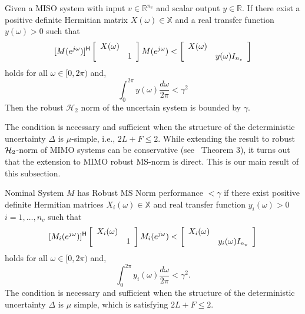 \begin{lemma}\label{MISOH_2}\cite{Sznaier1999RobustH2}
Given a MISO system with input $v\in \mathbb{R}^{n_v}$ and scalar output \(y\in\mathbb{R}\). If there exist a positive definite Hermitian matrix $X(\omega)\in \mathbb{X}$ and a real transfer function $y(\omega)>0$ such that
\begin{equation}\label{freqbound}
    [M(e^{j\omega})]^{\mathsf{H}} \left[
\begin{array}{cc}
    X(\omega) &  \\
     & 1
\end{array}\right]M(e^{j\omega})<\left[
\begin{array}{cc}
    X(\omega) &  \\
     & y(\omega)I_{n_v}
\end{array}\right]
\end{equation} holds for all $\omega\in[0,2\pi)$ and,
\begin{equation}\label{intbyfreq}
    \int_0^{2\pi}y(\omega)\frac{d\omega}{2\pi}<\gamma^2    
\end{equation}
Then the robust $\mathcal{H}_2$ norm of the uncertain system is bounded by $\gamma$.

\end{lemma}
The condition is necessary and sufficient when the structure of the deterministic uncertainty $\Delta$ is $\mu$-simple, i.e., $2L+F\leq2$. While extending the result to robust ${\cal H}_2$-norm of MIMO systems can be conservative (see~\cite{Sznaier2000WNrobustH2} Theorem 3), it turns out that the extension to MIMO robust MS-norm is direct. This is our main result of this subsection. 
\begin{thm}\label{thm:robMSnorm}
Nominal System $M$ has Robust MS Norm performance $<\gamma$ if there exist 
positive definite Hermitian matrices $X_i(\omega)\in \mathbb{X}$ and real transfer function $y_i(\omega)>0$
$i=1,\hdots,n_v$ such that 
\begin{equation}\label{eqn:freqbound_2}
    [M_i(e^{j\omega})]^{\mathsf{H}}\left[
\begin{array}{cc}
    X_i(\omega) &  \\
     & 1
\end{array}\right]M_i(e^{j\omega})<\left[
\begin{array}{cc}
    X_i(\omega) &  \\
     & y_i(\omega)I_{n_v}
\end{array}\right]
\end{equation} holds for all $\omega\in[0,2\pi)$ and,
\begin{equation}\label{eqn:intbyfreq_2}
    \int_0^{2\pi}y_i(\omega)\frac{d\omega}{2\pi}<\gamma^2.
\end{equation}
The condition is necessary and sufficient when the structure of the deterministic uncertainty $\Delta$ is $\mu$ simple, which is satisfying $2L+F\leq2$.
\end{thm}


